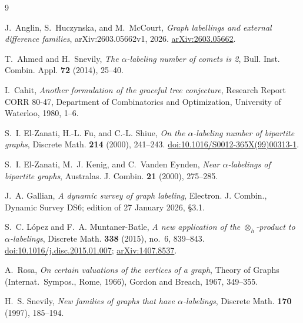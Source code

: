 \documentclass[11pt]{amsart}
\theoremstyle{definition}
\theoremstyle{remark}
\begin{document}
\begin{thebibliography}{9}

J.~Anglin, S.~Huczynska, and M.~McCourt,
\emph{Graph labellings and external difference families},
arXiv:2603.05662v1, 2026.
\href{https://arxiv.org/abs/2603.05662}{arXiv:2603.05662}.

T.~Ahmed and H.~Snevily,
\emph{The $\alpha$-labeling number of comets is 2},
Bull. Inst. Combin. Appl. \textbf{72} (2014), 25--40.

I.~Cahit,
\emph{Another formulation of the graceful tree conjecture},
Research Report CORR 80-47, Department of Combinatorics and Optimization,
University of Waterloo, 1980, 1--6.

S.~I. El-Zanati, H.-L. Fu, and C.-L. Shiue,
\emph{On the $\alpha$-labeling number of bipartite graphs},
Discrete Math. \textbf{214} (2000), 241--243.
\href{https://doi.org/10.1016/S0012-365X(99)00313-1}{doi:10.1016/S0012-365X(99)00313-1}.

S.~I. El-Zanati, M.~J. Kenig, and C.~Vanden Eynden,
\emph{Near $\alpha$-labelings of bipartite graphs},
Australas. J. Combin. \textbf{21} (2000), 275--285.

J.~A. Gallian,
\emph{A dynamic survey of graph labeling},
Electron. J. Combin., Dynamic Survey DS6; edition of 27 January 2026,
\S3.1.

S.~C. L\'opez and F.~A. Muntaner-Batle,
\emph{A new application of the $\otimes_h$-product to $\alpha$-labelings},
Discrete Math. \textbf{338} (2015), no.~6, 839--843.
\href{https://doi.org/10.1016/j.disc.2015.01.007}{doi:10.1016/j.disc.2015.01.007};
\href{https://arxiv.org/abs/1407.8537}{arXiv:1407.8537}.

A.~Rosa,
\emph{On certain valuations of the vertices of a graph},
Theory of Graphs (Internat.\ Sympos., Rome, 1966), Gordon and Breach, 1967,
349--355.

H.~S. Snevily,
\emph{New families of graphs that have $\alpha$-labelings},
Discrete Math. \textbf{170} (1997), 185--194.

\end{thebibliography}
\end{document}
